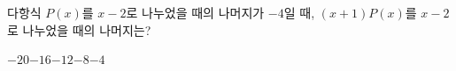 다항식 $P(x)$를 $x-2$로 나누었을 때의 나머지가 $-4$일 때, $(x+1)P(x)$를 $x-2$로 나누었을 때의 나머지는?
\begin{choices32}{$-20$}{$-16$}{$-12$}{$-8$}{$-4$}\end{choices32}
